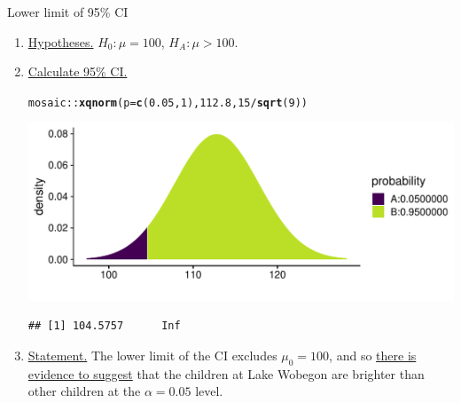 \documentclass[10pt]{beamer}\usepackage[]{graphicx}\usepackage[]{color}
\makeatletter
\def\maxwidth{ %
  \ifdim\Gin@nat@width>\linewidth
    \linewidth
  \else
    \Gin@nat@width
  \fi
}
\newcommand{\hlnum}[1]{\textcolor[rgb]{0.686,0.059,0.569}{#1}}%
\newcommand{\hlopt}[1]{\textcolor[rgb]{0,0,0}{#1}}%
\newcommand{\hlstd}[1]{\textcolor[rgb]{0.345,0.345,0.345}{#1}}%
\newcommand{\hlkwc}[1]{\textcolor[rgb]{0.333,0.667,0.333}{#1}}%
\newcommand{\hlkwd}[1]{\textcolor[rgb]{0.737,0.353,0.396}{\textbf{#1}}}%
\newenvironment{kframe}{%
 \def\at@end@of@kframe{}%
 \ifinner\ifhmode%
  \def\at@end@of@kframe{\end{minipage}}%
  \begin{minipage}{\columnwidth}%
 \fi\fi%
 \def\FrameCommand##1{\hskip\@totalleftmargin \hskip-\fboxsep
 \colorbox{shadecolor}{##1}\hskip-\fboxsep
     \hskip-\linewidth \hskip-\@totalleftmargin \hskip\columnwidth}%
 \MakeFramed {\advance\hsize-\width
   \@totalleftmargin\z@ \linewidth\hsize
   \@setminipage}}%
 {\par\unskip\endMakeFramed%
 \at@end@of@kframe}
\newenvironment{knitrout}{}{} %
\makeatother
\begin{document}
\begin{frame}[fragile]{Lower limit of 95\% CI}
	\small
	\begin{enumerate}
		\item \underline{Hypotheses.} $H_0: \mu = 100$, $H_A: \mu > 100$.
		\item \underline{Calculate 95\% CI.}
\begin{knitrout}\tiny
{}\color{fgcolor}\begin{kframe}
\begin{alltt}
\hlstd{mosaic}\hlopt{::}\hlkwd{xqnorm}\hlstd{(}\hlkwc{p} \hlstd{=} \hlkwd{c}\hlstd{(}\hlnum{0.05}\hlstd{,}\hlnum{1}\hlstd{),} \hlnum{112.8}\hlstd{,} \hlnum{15}\hlopt{/}\hlkwd{sqrt}\hlstd{(}\hlnum{9}\hlstd{))}
\end{alltt}
\end{kframe}

{\centering \includegraphics[width=\maxwidth]{figure/unnamed-chunk-17-1} 

}


\begin{kframe}\begin{verbatim}
## [1] 104.5757      Inf
\end{verbatim}
\end{kframe}
\end{knitrout}
		\pause 
		\item \underline{Statement.} The lower limit of the CI excludes $\mu_0=100$, and so \underline{there is evidence to suggest} that the children at Lake Wobegon are brighter than other children at the $\alpha=0.05$ level.
	\end{enumerate}
	
\end{frame}
\end{document}
